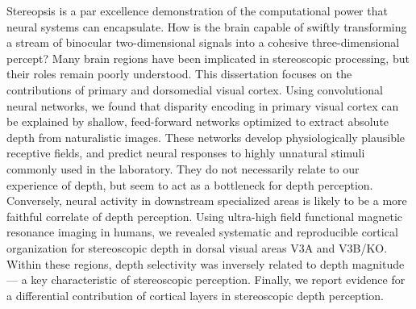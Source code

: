 


\begin{abstracts}        %

Stereopsis is a par excellence demonstration of the computational power that neural systems can encapsulate. How is the brain capable of swiftly transforming a stream of binocular two-dimensional signals into a cohesive three-dimensional percept? Many brain regions have been implicated in stereoscopic processing, but their roles remain poorly understood. This dissertation focuses on the contributions of primary and dorsomedial visual cortex. Using convolutional neural networks, we found that disparity encoding in primary visual cortex can be explained by shallow, feed-forward networks optimized to extract absolute depth from naturalistic images. These networks develop physiologically plausible receptive fields, and predict neural responses to highly unnatural stimuli commonly used in the laboratory. They do not necessarily relate to our experience of depth, but seem to act as a bottleneck for depth perception. Conversely, neural activity in downstream specialized areas is likely to be a more faithful correlate of depth perception. Using ultra-high field functional magnetic resonance imaging in humans, we revealed systematic and reproducible cortical organization for stereoscopic depth in dorsal visual areas V3A and V3B/KO. Within these regions, depth selectivity was inversely related to depth magnitude --- a key characteristic of stereoscopic perception. Finally, we report evidence for a differential contribution of cortical layers in stereoscopic depth perception.

\end{abstracts}




